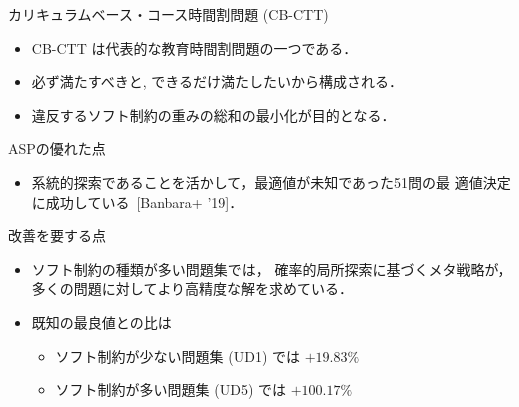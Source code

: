 \documentclass[11pt,dvipdfmx]{beamer}
\begin{document}
\begin{frame}{カリキュラムベース・コース時間割問題 (CB-CTT)}
  \begin{itemize}
  \item CB-CTT は代表的な教育時間割問題の一つである．
  \item 必ず満たすべきと, 
    できるだけ満たしたいから構成される．
  \item 違反するソフト制約の重みの総和の最小化が目的となる．
  \end{itemize}

  \begin{alertblock}{ASPの優れた点}
    \begin{itemize}
    \item 系統的探索であることを活かして，最適値が未知であった51問の最
      適値決定に成功している~[Banbara+ '19]．
  \end{itemize}    
  \end{alertblock}

  \begin{block}{改善を要する点}
    \begin{itemize}
    \item ソフト制約の種類が多い問題集では，
      確率的局所探索に基づくメタ戦略が，
      多くの問題に対してより高精度な解を求めている．
     \item 既知の最良値との比は
       \begin{itemize}
       \item ソフト制約が少ない問題集 (UD1) では $+19.83\%$
       \item ソフト制約が多い問題集 (UD5) では $+100.17\%$
       \end{itemize}
    \end{itemize}
  \end{block}
\end{frame}
\end{document}
